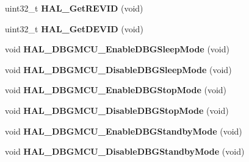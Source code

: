 \begin{DoxyCompactItemize}
\item 
uint32\+\_\+t {\bfseries H\+A\+L\+\_\+\+Get\+R\+E\+V\+ID} (void)\hypertarget{group___h_a_l___exported___functions___group2_gae051ef9e932404b21f5877c7186406b8}{}\label{group___h_a_l___exported___functions___group2_gae051ef9e932404b21f5877c7186406b8}

\item 
uint32\+\_\+t {\bfseries H\+A\+L\+\_\+\+Get\+D\+E\+V\+ID} (void)\hypertarget{group___h_a_l___exported___functions___group2_gaff785f069ed650de77ff82ac407f7c84}{}\label{group___h_a_l___exported___functions___group2_gaff785f069ed650de77ff82ac407f7c84}

\item 
void {\bfseries H\+A\+L\+\_\+\+D\+B\+G\+M\+C\+U\+\_\+\+Enable\+D\+B\+G\+Sleep\+Mode} (void)\hypertarget{group___h_a_l___exported___functions___group2_gaf031bcc71ebad9b7edf405547efd762b}{}\label{group___h_a_l___exported___functions___group2_gaf031bcc71ebad9b7edf405547efd762b}

\item 
void {\bfseries H\+A\+L\+\_\+\+D\+B\+G\+M\+C\+U\+\_\+\+Disable\+D\+B\+G\+Sleep\+Mode} (void)\hypertarget{group___h_a_l___exported___functions___group2_gac7820d0561f19999a68d714655b901b5}{}\label{group___h_a_l___exported___functions___group2_gac7820d0561f19999a68d714655b901b5}

\item 
void {\bfseries H\+A\+L\+\_\+\+D\+B\+G\+M\+C\+U\+\_\+\+Enable\+D\+B\+G\+Stop\+Mode} (void)\hypertarget{group___h_a_l___exported___functions___group2_gadf25043b17de4bef38a95a75fd03e5c4}{}\label{group___h_a_l___exported___functions___group2_gadf25043b17de4bef38a95a75fd03e5c4}

\item 
void {\bfseries H\+A\+L\+\_\+\+D\+B\+G\+M\+C\+U\+\_\+\+Disable\+D\+B\+G\+Stop\+Mode} (void)\hypertarget{group___h_a_l___exported___functions___group2_ga2c93dcee35e5983d74f1000de7c042d5}{}\label{group___h_a_l___exported___functions___group2_ga2c93dcee35e5983d74f1000de7c042d5}

\item 
void {\bfseries H\+A\+L\+\_\+\+D\+B\+G\+M\+C\+U\+\_\+\+Enable\+D\+B\+G\+Standby\+Mode} (void)\hypertarget{group___h_a_l___exported___functions___group2_ga28a1323b2eeb0a408c1cfdbfa0db5ead}{}\label{group___h_a_l___exported___functions___group2_ga28a1323b2eeb0a408c1cfdbfa0db5ead}

\item 
void {\bfseries H\+A\+L\+\_\+\+D\+B\+G\+M\+C\+U\+\_\+\+Disable\+D\+B\+G\+Standby\+Mode} (void)\hypertarget{group___h_a_l___exported___functions___group2_ga7faa58d8508ea3123b9f247a70379779}{}\label{group___h_a_l___exported___functions___group2_ga7faa58d8508ea3123b9f247a70379779}


\end{DoxyCompactItemize}
